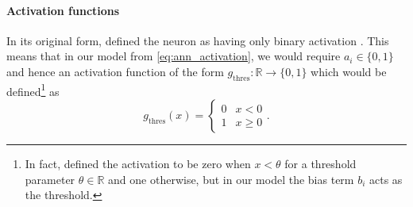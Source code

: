 \paragraph{Activation functions}
In its original form, \citeauthor{mcculloch1943} defined the neuron as having only binary activation \cite*{mcculloch1943}. 
This means that in our model from \ref{eq:ann_activation}, we would require $a_i \in \{0, 1\}$ and hence an activation function of the form $g_\text{thres}: \mathbb{R} \rightarrow \{0, 1\}$ which would be defined\footnote{In fact, \citeauthor{mcculloch1943} defined the activation to be zero when $x<\theta$ for a threshold parameter $\theta \in \mathbb{R}$ and one otherwise, but in our model the bias term $b_i$ acts as the threshold.} as
\begin{equation}
    \label{eq:thres_activation}
    g_\text{thres}(x) = \begin{cases} 
        0 & x < 0 \\
        1 & x \geq 0
    \end{cases}.
\end{equation}


